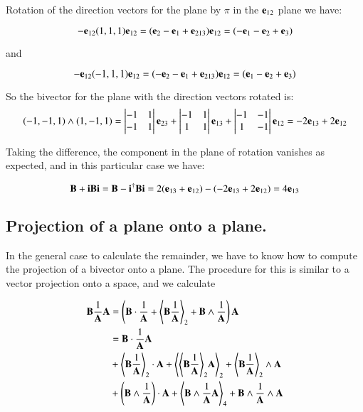 \documentclass{article}      %
\newcommand{\gpgrade}[2] {{\left\langle{{#1}}\right\rangle}_{#2}}
\newcommand{\gpgradetwo}[1] {\gpgrade{#1}{2}}
\newcommand{\gpgradefour}[1] {\gpgrade{#1}{4}}
\begin{document}
Rotation of the direction vectors for the plane by $\pi$ in the $\mathbf{e}_{12}$ plane we have:

\[
-\mathbf{e}_{12}(1,1,1)\mathbf{e}_{12}= 
(\mathbf{e}_{2}
-\mathbf{e}_{1}
+\mathbf{e}_{213})\mathbf{e}_{12}
= (-\mathbf{e}_{1} -\mathbf{e}_{2} + \mathbf{e}_{3})
\]

and

\[
-\mathbf{e}_{12}(-1,1,1)\mathbf{e}_{12}= 
(-\mathbf{e}_{2}
-\mathbf{e}_{1}
+\mathbf{e}_{213})\mathbf{e}_{12}
= (\mathbf{e}_{1} -\mathbf{e}_{2} + \mathbf{e}_{3})
\]

So the bivector for the plane with the direction vectors rotated is:
\[
(-1,-1,1)\wedge(1,-1,1) = 
\begin{vmatrix}
 -1 & 1 \\
 -1 & 1 \\
\end{vmatrix}
\mathbf{e}_{23}
+
\begin{vmatrix}
 -1 & 1 \\
 1 & 1 \\
\end{vmatrix}
\mathbf{e}_{13}
+
\begin{vmatrix}
 -1 & -1 \\
 1 & -1 \\
\end{vmatrix}
\mathbf{e}_{12}
=
-2\mathbf{e}_{13} + 2\mathbf{e}_{12}
\]

Taking the difference, the component in the plane of rotation vanishes as expected, and in this particular case we have:

\[
\mathbf{B} + \mathbf{i}\mathbf{B}\mathbf{i} = \mathbf{B} - \mathbf{i}^\dagger\mathbf{B}\mathbf{i} = 
2(\mathbf{e}_{13} + \mathbf{e}_{12}) -(-2\mathbf{e}_{13} + 2\mathbf{e}_{12}) = 4\mathbf{e}_{13}
\]

\subsection{ Projection of a plane onto a plane. }

In the general case to calculate the remainder, we have to know how to compute the projection of a bivector onto a plane.  The procedure for this is similar to a vector
projection onto a space, and we calculate

\begin{align*}
\BB\inv{\BA}\BA 
&= \left(\BB \cdot \inv{\BA} + \gpgradetwo{ \BB \inv{\BA} } + \BB \wedge \inv{\BA}\right) \BA \\
&= 
\BB \cdot \inv{\BA} \BA \\
&
+\gpgradetwo{ \BB \inv{\BA} } \cdot \BA 
+\gpgradetwo{ \gpgradetwo{ \BB \inv{\BA} } \BA }
+\gpgradetwo{ \BB \inv{\BA} } \wedge \BA \\
&
+\left(\BB \wedge \inv{\BA}\right) \cdot \BA 
+\gpgradefour{\BB \wedge \inv{\BA} \BA}
+\BB \wedge \inv{\BA} \wedge \BA \\
\end{align*}
\end{document}
